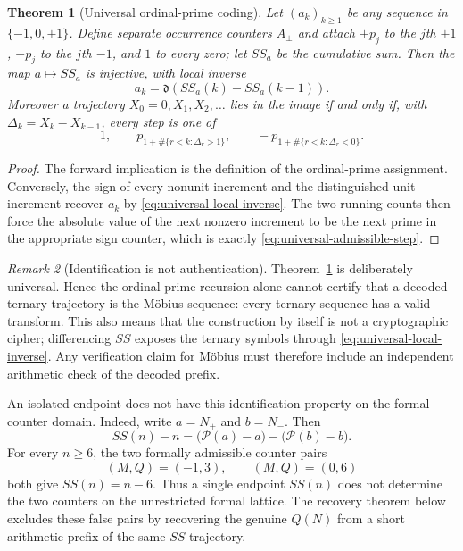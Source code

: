 \documentclass[11pt]{amsart}
\numberwithin{equation}{section}
\theoremstyle{plain}
\newtheorem{theorem}{Theorem}[section]
\theoremstyle{definition}
\theoremstyle{remark}
\newtheorem{remark}[theorem]{Remark}
\begin{document}
\begin{theorem}[Universal ordinal-prime coding]
\label{thm:universal-coding}
Let $(a_k)_{k\ge1}$ be any sequence in $\{-1,0,+1\}$.  Define separate
occurrence counters $A_\pm$ and attach $+p_j$ to the $j$th $+1$, $-p_j$ to the
$j$th $-1$, and $1$ to every zero; let $SS_a$ be the cumulative sum.  Then the
map $a\mapsto SS_a$ is injective, with local inverse
\begin{equation}
\label{eq:universal-local-inverse}
a_k=\mathfrak d\!\left(SS_a(k)-SS_a(k-1)\right).
\end{equation}
Moreover a trajectory $X_0=0,X_1,X_2,\ldots$ lies in the image if and only if,
with $\Delta_k=X_k-X_{k-1}$, every step is one of
\begin{equation}
\label{eq:universal-admissible-step}
1,\qquad
p_{1+\#\{r<k:\Delta_r>1\}},\qquad
-p_{1+\#\{r<k:\Delta_r<0\}}.
\end{equation}
\end{theorem}

\begin{proof}
The forward implication is the definition of the ordinal-prime assignment.
Conversely, the sign of every nonunit increment and the distinguished unit
increment recover $a_k$ by \eqref{eq:universal-local-inverse}.  The two running
counts then force the absolute value of the next nonzero increment to be the
next prime in the appropriate sign counter, which is exactly
\eqref{eq:universal-admissible-step}.
\end{proof}

\begin{remark}[Identification is not authentication]
\label{rem:identification-not-authentication}
Theorem~\ref{thm:universal-coding} is deliberately universal.  Hence the
ordinal-prime recursion alone cannot certify that a decoded ternary trajectory
is the M\"obius sequence: every ternary sequence has a valid transform.  This
also means that the construction by itself is not a cryptographic cipher;
differencing $SS$ exposes the ternary symbols through
\eqref{eq:universal-local-inverse}.  Any verification claim for M\"obius must
therefore include an independent arithmetic check of the decoded prefix.
\end{remark}

An isolated endpoint does not have this identification property on the formal
counter domain.  Indeed, write $a=N_+$ and $b=N_-$.  Then
\begin{equation}
\label{eq:ss-formal-difference-set}
SS(n)-n=\bigl(\mathcal P(a)-a\bigr)-\bigl(\mathcal P(b)-b\bigr).
\end{equation}
For every $n\ge6$, the two formally admissible counter pairs
\begin{equation}
\label{eq:ss-formal-collision-example}
(M,Q)=(-1,3),\qquad (M,Q)=(0,6)
\end{equation}
both give $SS(n)=n-6$.  Thus a single endpoint $SS(n)$ does not determine the
two counters on the unrestricted formal lattice.  The recovery theorem below
excludes these false pairs by recovering the genuine $Q(N)$ from a short
arithmetic prefix of the same $SS$ trajectory.
\end{document}
